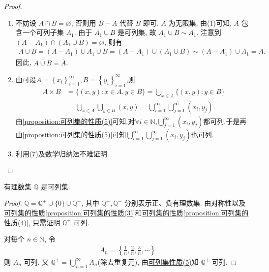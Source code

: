 \documentclass[../../main.tex]{subfiles}
\begin{document}
\begin{proof}
\begin{enumerate}[(1)]
\item 不妨设 $A \cap B = \varnothing$, 否则用 $B - A$ 代替 $B$ 即可. $A$ 为无限集, 由(1)可知, $A$ 包含一个可列子集 $A_1$. 由于 $A_1 \cup B$ 是可列集, 故 $A_1 \cup B \sim A_1$. 注意到 $(A - A_1) \cap (A_1 \cup B) = \varnothing$, 则有
\begin{align*}
A \cup B = (A - A_1) \cup A_1 \cup B
= (A - A_1) \cup (A_1 \cup B) \sim (A - A_1) \cup A_1 = A.
\end{align*}
因此, $\overline{\overline{A \cup B}} = \overline{\overline{A}}$. 

\item 由可设$A=\left\{ x_i \right\} _{i=1}^{\infty},B=\left\{ y_i \right\} _{i=1}^{\infty}$,则
\begin{align*}
A\times B&=\{(x,y):x\in A,y\in B\}=\bigcup_{x\in A}{\{(x,y):y}\in B\}
\\
&=\bigcup_{x\in A}{\bigcup_{y\in B}{\left( x,y \right)}}=\bigcup_{i=1}^{\infty}{\bigcup_{j=1}^{\infty}{\left( x_i,y_j \right)}}.
\end{align*}
由\ref{proposition:可列集的性质(5)}可知,对$\forall i\in \mathbb{N}$,$\bigcup_{j=1}^{\infty}{\left( x_i,y_j \right)}$都可列.于是再由\ref{proposition:可列集的性质(5)}可知$\bigcup_{i=1}^{\infty}{\bigcup_{j=1}^{\infty}{\left( x_i,y_j \right)}}$也可列.

\item 利用(7)及数学归纳法不难证明.
\end{enumerate}
\end{proof}

\begin{example}
有理数集 $\mathbb{Q}$ 是可列集.
\end{example}
\begin{proof}
$\mathbb{Q} = \mathbb{Q}^+ \cup \{0\} \cup \mathbb{Q}^-$, 其中 $\mathbb{Q}^+, \mathbb{Q}^-$ 分别表示正、负有理数集. 由对称性以及\hyperref[proposition:可列集的性质(3)]{可列集的性质\ref{proposition:可列集的性质(3)}}和\hyperref[proposition:可列集的性质(4)]{可列集的性质\ref{proposition:可列集的性质(4)}}, 只需证明 $\mathbb{Q}^+$ 可列.

对每个 $n \in \mathbb{N}$, 令
\begin{align*}
A_n = \left\{\frac{1}{n}, \frac{2}{n}, \frac{3}{n}, \cdots\right\}
\end{align*}
则 $A_n$ 可列. 又 $\mathbb{Q}^+ = \bigcup_{n = 1}^{\infty} A_n$(除去重复元), 由\hyperref[proposition:可列集的性质]{可列集性质(5)}知 $\mathbb{Q}^+$ 可列.
\end{proof}
\end{document}
